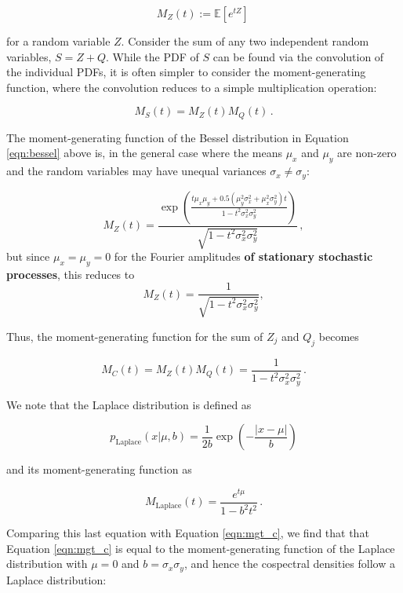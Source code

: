 \documentclass[12pt]{emulateapj}
\begin{document}
\begin{equation}
M_Z(t) := \mathbb{E}[e^{tZ}] \, 
\end{equation}

\noindent for a random variable $Z$. Consider the sum of any two independent random variables, $S = Z + Q$. While the PDF of $S$ can be found via the convolution of the individual PDFs, it is often simpler to consider the moment-generating function, where the convolution reduces to a simple multiplication operation:

\begin{equation}
M_S(t) = M_Z(t) M_Q(t) \, .
\end{equation} 

\noindent The moment-generating function of the Bessel distribution in Equation \ref{eqn:bessel} above is, in the general case \citep{seijas2012} where the means $\mu_x$ and $\mu_y$ are non-zero and the random variables may have unequal variances $\sigma_x \neq \sigma_y$: 

\begin{equation}
M_Z(t) = \frac{\exp{\left( \frac{t\mu_x \mu_y + 0.5 (\mu_y^2 \sigma_x^2 + \mu_x^2 \sigma_y^2) t}{1 - t^2 \sigma_x^2 \sigma_y^2} \right)}}{\sqrt{1 - t^2 \sigma_x^2 \sigma_y^2}}\, ,
\end{equation}
but since $\mu_x = \mu_y = 0$ for the Fourier amplitudes \textbf{of stationary stochastic processes}, this reduces to
\begin{equation}
M_Z(t) =  \frac{1}{\sqrt{1 - t^2 \sigma_x^2 \sigma_y^2}}  \label{eqn:mgf},
\end{equation}

Thus, the moment-generating function for the sum of $Z_j$ and $Q_j$ becomes

\begin{equation}
M_C(t) = M_Z(t) M_Q(t) = \frac{1}{1 - t^2 \sigma_x^2 \sigma_y^2} \, .
\label{eqn:mgt_c}
\end{equation}

\noindent We note that the Laplace distribution is defined as 

\[
p_{\mathrm{Laplace}}(x | \mu, b) = \frac{1}{2b} \exp{\left(-\frac{|x - \mu|}{b} \right)}
\]

\noindent and its moment-generating function as

\[
M_\mathrm{Laplace}(t) = \frac{e^{t\mu}}{1 - b^2 t^2} \, .
\]

Comparing this last equation with Equation \ref{eqn:mgt_c}, we find that that Equation \ref{eqn:mgt_c} is equal to the moment-generating function of the Laplace distribution with $\mu = 0$ and $b = \sigma_x \sigma_y$, and hence the cospectral densities follow a Laplace distribution:
\end{document}
